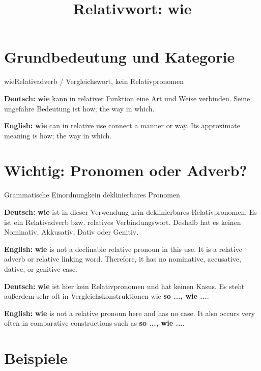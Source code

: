 \documentclass[a4paper,11pt]{article}
\title{Relativwort: \glqq wie\grqq{}}
\date{}
\newcommand{\GermanText}[1]{\textbf{Deutsch: }#1\par}
\newcommand{\EnglishText}[1]{{\small\color{SoftGray}\textbf{English: }#1\par}}
\begin{document}
\maketitle

\tableofcontents

\newpage

\section{Grundbedeutung und Kategorie}

\begin{grammarentry}{wie}{Relativadverb / Vergleichswort, kein Relativpronomen}

\GermanText{\textbf{wie} kann in relativer Funktion eine Art und Weise verbinden. Seine ungefähre Bedeutung ist \glqq how; the way in which\grqq{}.}

\EnglishText{\textbf{wie} can in relative use connect a manner or way. Its approximate meaning is \glqq how; the way in which\grqq{}.}

\end{grammarentry}

\section{Wichtig: Pronomen oder Adverb?}

\begin{grammarentry}{Grammatische Einordnung}{kein deklinierbares Pronomen}

\GermanText{\textbf{wie} ist in dieser Verwendung kein deklinierbares Relativpronomen. Es ist ein Relativadverb bzw. relatives Verbindungswort. Deshalb hat es keinen Nominativ, Akkusativ, Dativ oder Genitiv.}

\EnglishText{\textbf{wie} is not a declinable relative pronoun in this use. It is a relative adverb or relative linking word. Therefore, it has no nominative, accusative, dative, or genitive case.}

\GermanText{\textbf{wie} ist hier kein Relativpronomen und hat keinen Kasus. Es steht außerdem sehr oft in Vergleichskonstruktionen wie \textbf{so ..., wie ...}.}

\EnglishText{\textbf{wie} is not a relative pronoun here and has no case. It also occurs very often in comparative constructions such as \textbf{so ..., wie ...}.}

\end{grammarentry}

\section{Beispiele}
\end{document}

